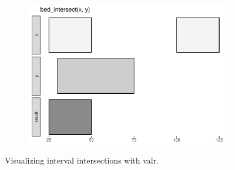 


\begin{figure}
\centering
    \begin{subfigure}[b]{0.45\textwidth}
\begin{Shaded}
\begin{Highlighting}[]
\StringTok{ }\NormalTok{(}
  \NormalTok{, }\NormalTok{,     }\NormalTok{,}
  \NormalTok{, }\NormalTok{,    }
\NormalTok{)}

\StringTok{ }\NormalTok{(}
  \NormalTok{, }\NormalTok{,     }
\NormalTok{)}

\NormalTok{(}
\end{Highlighting}
\end{Shaded}
        \label{fig:bed_glyph_code}
    \end{subfigure}
    ~
\begin{subfigure}[b]{0.45\textwidth}
        \includegraphics[width=\textwidth]{intersect_glyph-1.pdf}
        \label{fig:bed_glyph_out}
    \end{subfigure}
\caption{\label{fig:your-figure}Visualizing interval intersections with valr.	 }
\end{figure}


